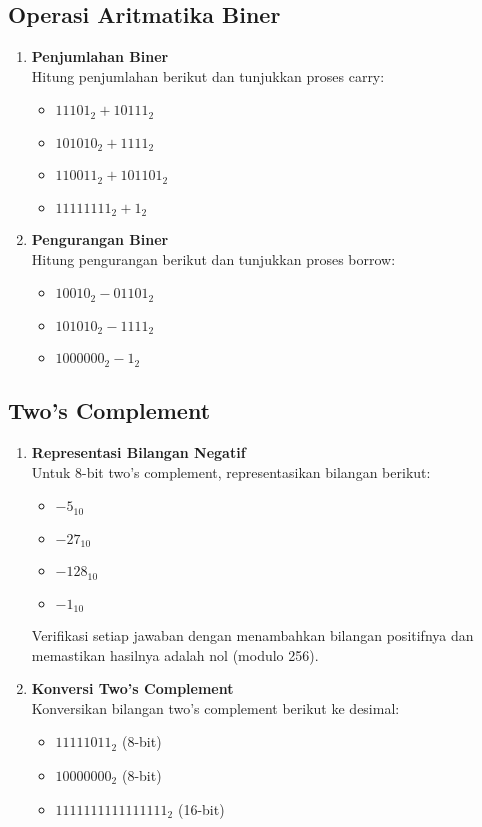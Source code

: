 \subsection{Operasi Aritmatika Biner}

\begin{enumerate}
    \item \textbf{Penjumlahan Biner}\\
    Hitung penjumlahan berikut dan tunjukkan proses carry:
    \begin{itemize}
        \item \(11101_2 + 10111_2\)
        \item \(101010_2 + 1111_2\)
        \item \(110011_2 + 101101_2\)
        \item \(11111111_2 + 1_2\)
    \end{itemize}

    \item \textbf{Pengurangan Biner}\\
    Hitung pengurangan berikut dan tunjukkan proses borrow:
    \begin{itemize}
        \item \(10010_2 - 01101_2\)
        \item \(101010_2 - 1111_2\)
        \item \(1000000_2 - 1_2\)
    \end{itemize}
\end{enumerate}

\subsection{Two's Complement}

\begin{enumerate}
    \item \textbf{Representasi Bilangan Negatif}\\
    Untuk 8-bit two's complement, representasikan bilangan berikut:
    \begin{itemize}
        \item \(-5_{10}\)
        \item \(-27_{10}\)
        \item \(-128_{10}\)
        \item \(-1_{10}\)
    \end{itemize}
    
    Verifikasi setiap jawaban dengan menambahkan bilangan positifnya dan memastikan hasilnya adalah nol (modulo 256).

    \item \textbf{Konversi Two's Complement}\\
    Konversikan bilangan two's complement berikut ke desimal:
    \begin{itemize}
        \item \(11111011_2\) (8-bit)
        \item \(10000000_2\) (8-bit)
        \item \(1111111111111111_2\) (16-bit)
    \end{itemize}
\end{enumerate}

